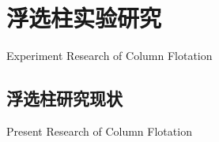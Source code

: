 \chapter{浮选柱实验研究}{Experiment Research of Column Flotation}
\section{浮选柱研究现状}{Present Research of Column Flotation}

